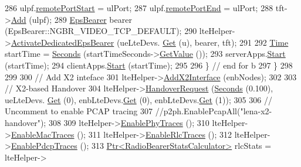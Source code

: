 \begin{DoxyCode}
286           ulpf.\hyperlink{structns3_1_1EpcTft_1_1PacketFilter_aa96ab9356c91b14059220d00155c32b5}{remotePortStart} = ulPort;
287           ulpf.\hyperlink{structns3_1_1EpcTft_1_1PacketFilter_a4bcdd15a9526e27eabd474276f691cf1}{remotePortEnd} = ulPort;
288           tft->\hyperlink{classns3_1_1EpcTft_a1228456a8abbe48cbc89bbe2d2e9af48}{Add} (ulpf);
289           \hyperlink{structns3_1_1EpsBearer}{EpsBearer} bearer (EpsBearer::NGBR\_VIDEO\_TCP\_DEFAULT);
290           lteHelper->\hyperlink{classns3_1_1LteHelper_af28041edd4c96bde1a2e07c90e363dcc}{ActivateDedicatedEpsBearer} (ueLteDevs.
      \hyperlink{classns3_1_1NetDeviceContainer_a677d62594b5c9d2dea155cc5045f4d0b}{Get} (u), bearer, tft);
291 
292           \hyperlink{classns3_1_1Time}{Time} startTime = \hyperlink{group__timecivil_ga33c34b816f8ff6628e33d5c8e9713b9e}{Seconds} (startTimeSeconds->\hyperlink{classns3_1_1UniformRandomVariable_a03822d8c86ac51e9aa83bbc73041386b}{GetValue} ());
293           serverApps.\hyperlink{classns3_1_1ApplicationContainer_a8eff87926507020bbe3e1390358a54a7}{Start} (startTime);
294           clientApps.\hyperlink{classns3_1_1ApplicationContainer_a8eff87926507020bbe3e1390358a54a7}{Start} (startTime);
295 
296         \} \textcolor{comment}{// end for b}
297     \}
298 
299 
300   \textcolor{comment}{// Add X2 inteface}
301   lteHelper->\hyperlink{classns3_1_1LteHelper_adbbd435f439200097e88a2965668bc26}{AddX2Interface} (enbNodes);
302 
303   \textcolor{comment}{// X2-based Handover}
304   lteHelper->\hyperlink{classns3_1_1LteHelper_a5b612c3b8d529e68b848cdca95838087}{HandoverRequest} (\hyperlink{group__timecivil_ga33c34b816f8ff6628e33d5c8e9713b9e}{Seconds} (0.100), ueLteDevs.
      \hyperlink{classns3_1_1NetDeviceContainer_a677d62594b5c9d2dea155cc5045f4d0b}{Get} (0), enbLteDevs.\hyperlink{classns3_1_1NetDeviceContainer_a677d62594b5c9d2dea155cc5045f4d0b}{Get} (0), enbLteDevs.\hyperlink{classns3_1_1NetDeviceContainer_a677d62594b5c9d2dea155cc5045f4d0b}{Get} (1));
305 
306   \textcolor{comment}{// Uncomment to enable PCAP tracing}
307   \textcolor{comment}{//p2ph.EnablePcapAll("lena-x2-handover");}
308 
309   lteHelper->\hyperlink{classns3_1_1LteHelper_ad6d7edf234d29f7b8363e9ebf73fe32e}{EnablePhyTraces} ();
310   lteHelper->\hyperlink{classns3_1_1LteHelper_affa3a12841520407d3662417fe41863d}{EnableMacTraces} ();
311   lteHelper->\hyperlink{classns3_1_1LteHelper_abadfdd04d30b261e9b6f0846b4784928}{EnableRlcTraces} ();
312   lteHelper->\hyperlink{classns3_1_1LteHelper_adc62a53efe0437cf09062c9d6a95af3d}{EnablePdcpTraces} ();
313   \hyperlink{classns3_1_1Ptr}{Ptr<RadioBearerStatsCalculator>} rlcStats = lteHelper->

\end{DoxyCode}
